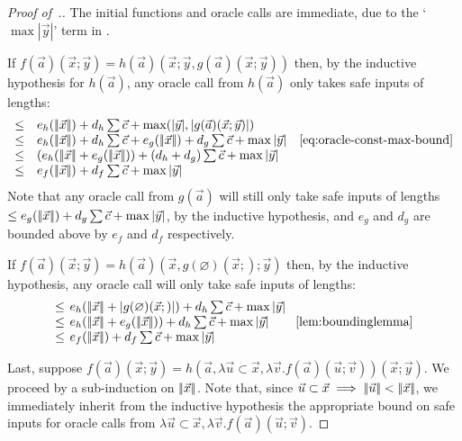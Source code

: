 \documentclass[manuscript,screen]{acmart}
\renewcommand{\emptyset}{\varnothing}
\theoremstyle{definition}
\theoremstyle{remark}
\newcommand{\permpref}{\subset}
\newcommand{\sumlen}[1]{|\hspace{-.15em}|#1|\hspace{-.15em}|}
\begin{document}
\begin{proof}[Proof of~.]
The initial functions and oracle calls are immediate, due to the `$\max |\vec y|$' term in . 

If $f(\vec a)(\vec x; \vec y) = h(\vec a)(\vec x; \vec y, g(\vec a)(\vec x; \vec y))$ then, by the inductive hypothesis for $h(\vec a)$, any oracle call from $h(\vec a)$ only takes safe inputs of lengths:
    \[
    \begin{array}{rll}
        \leq & e_h(\sumlen{\vec x}) + d_h \sum \vec c + \max (|\vec y|, |g(\vec a)(\vec x;\vec y)|) \\
        \leq & e_h(\sumlen{\vec x})+ d_h \sum \vec c + e_g(\sumlen{\vec x}) + d_g\sum \vec c + \max |\vec y| & \text{\eqref{eq:oracle-const-max-bound}} \\
        \leq &  (e_h(\sumlen{\vec x} + e_g(\sumlen{\vec x})) + (d_h +d_g)\sum\vec c + \max |\vec y|\\
         \leq & e_f(\sumlen{\vec x}) + d_f\sum\vec c + \max|\vec y|
    \end{array}
    \]
    Note that any oracle call from $g(\vec a)$ will still only take safe inputs of lengths $\leq e_g(\sumlen{\vec x}) + d_g\sum \vec c + \max |\vec y|$, by the inductive hypothesis, and $e_g$ and $d_g$ are bounded above by $e_f$ and $d_f $ respectively.
    
If $f(\vec a)(\vec x;\vec y) = h(\vec a)(\vec x, g(\emptyset)(\vec x;);\vec y)$ then, by the inductive hypothesis, any oracle call will only take safe inputs of lengths:
\[
\arraycolsep=2pt
\begin{array}{rlll}
    \leq & e_h(\sumlen{\vec x} + |g(\emptyset)(\vec x;)|) + d_h\sum\vec c + \max |\vec y| \\
    \leq & e_h(\sumlen{\vec x} + e_g(\sumlen{\vec x})) + d_h\sum\vec c + \max |\vec y| & & \text{\Cref{lem:boundinglemma}} \\
    \leq & e_f(\sumlen{\vec x}) + d_f\sum \vec c + \max |\vec y|
\end{array}
\]

Last, suppose $f(\vec a)(\vec x;\vec y)= h(\vec a, \lambda \vec u\permpref \vec x, \lambda \vec v . f(\vec a)(\vec u;\vec v))(\vec x;\vec y)$. 
We proceed by a sub-induction on $\sumlen{\vec x}$.
Note that, since $\vec u \permpref \vec x \implies \sumlen{\vec u} <\sumlen{\vec x}$, we immediately inherit from the inductive hypothesis the appropriate bound on safe inputs for oracle calls from $\lambda \vec u\permpref \vec x, \lambda \vec v. f(\vec a)(\vec u;\vec v)$.


\end{proof}
\end{document}
